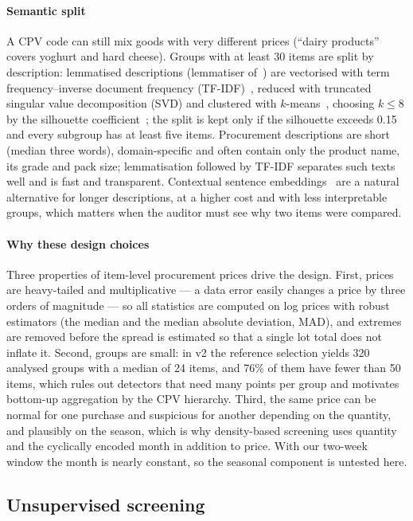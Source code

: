 \documentclass[conference]{IEEEtran}
\begin{document}
\paragraph{Semantic split} A CPV code can still mix goods with very different prices (``dairy products''
covers yoghurt and hard cheese). Groups with at least 30 items are split by description: lemmatised
descriptions (lemmatiser of~\cite{korobov2015pymorphy}) are vectorised with term frequency--inverse
document frequency (TF-IDF)~\cite{salton1988weighting}, reduced with truncated singular value
decomposition (SVD) and
clustered with $k$-means~\cite{macqueen1967kmeans}, choosing $k\le 8$ by the silhouette
coefficient~\cite{rousseeuw1987silhouettes}; the split is kept only if the silhouette exceeds 0.15 and every
subgroup has at least five items. Procurement descriptions are short (median three words), domain-specific
and often contain only the product name, its grade and pack size; lemmatisation followed by TF-IDF separates
such texts well and is fast and transparent. Contextual sentence embeddings~\cite{reimers2019sbert} are a
natural alternative for longer descriptions, at a higher cost and with less interpretable groups, which
matters when the auditor must see why two items were compared.

\paragraph{Why these design choices} Three properties of item-level procurement prices drive the design.
First, prices are heavy-tailed and multiplicative --- a data error easily changes a price by three orders of
magnitude --- so all statistics are computed on log prices with robust estimators (the median and the
median absolute deviation, MAD), and
extremes are removed before the spread is estimated so that a single lot total does not inflate it.
Second, groups are small: in v2 the reference selection yields 320 analysed groups with a median of 24
items, and 76\% of them have fewer than 50 items,
which rules out detectors that need many points per group and motivates bottom-up aggregation by the CPV
hierarchy. Third, the same price can be normal for one purchase and suspicious for another depending on
the quantity, and plausibly on the season, which is why density-based screening uses quantity and the
cyclically encoded month in addition to price. With our two-week window the month is nearly constant, so
the seasonal component is untested here.

\subsection{Unsupervised screening}
\end{document}
